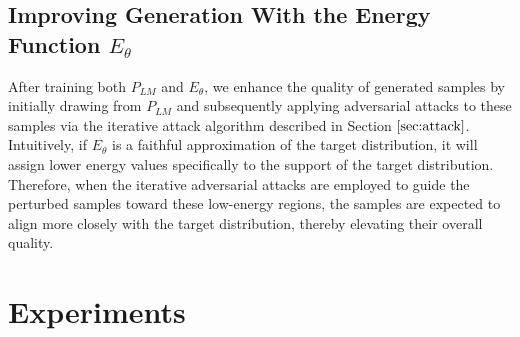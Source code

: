 \documentclass[11pt]{article}
\begin{document}
\subsection{Improving Generation With the Energy Function \(E_\theta\)}



After training both \(P_{LM}\) and \(E_\theta\), we enhance the quality of generated samples by initially drawing from \(P_{LM}\) and subsequently applying adversarial attacks to these samples via the iterative attack algorithm described in Section \(\ref{sec:attack}\).  Intuitively, if \(E_\theta\) is a faithful approximation of the target distribution, it will assign lower energy values specifically to the support of the target distribution. Therefore, when the iterative adversarial attacks are employed to guide the perturbed samples toward these low-energy regions, the samples are expected to align more closely with the target distribution, thereby elevating their overall quality.



  



\section{Experiments}
\end{document}

